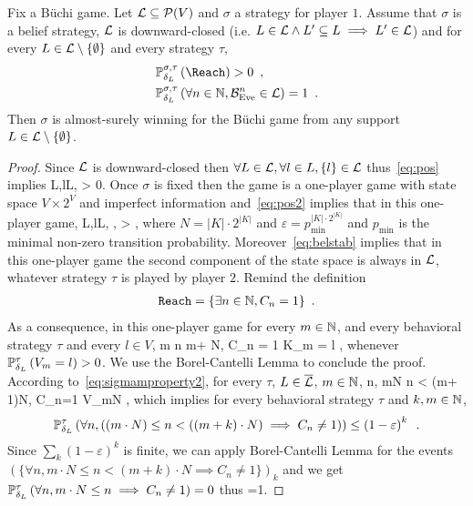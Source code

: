 \begin{lemma}\label{lem:borelcantelli}
{Fix a B{\"u}chi game.}
Let $\mathcal{L} \subseteq \mathcal{P}(V)$ 
and $\sigma$ a strategy for player $1$.
Assume that
$\sigma$ is a belief
strategy,
$\mathcal{L}$ is downward-closed
(i.e. $L\in\mathcal{L} \land L' \subseteq L \implies L'\in \mathcal{L}$)
and for every $L\in\mathcal{L}\setminus \{\emptyset\}$ and every strategy $\tau$,
\begin{align}
\label{eq:pos}
& \probimp{\sigma,\tau}{\delta_L}{\Reach} > 0\enspace,\\
 \label{eq:belstab}
&\probimp{\sigma,\tau}{\delta_L}{\forall n\in\NN,\belun^n\in \LL} = 1\enspace.
\end{align}
Then $\sigma$ is almost-surely winning for the B{\"u}chi game from any support 
$L\in \mathcal{L}\setminus \{\emptyset\}$. 
\end{lemma}
\begin{proof}
{
Since $\mathcal{L}$ is downward-closed then $\forall L\in \mathcal{L},\forall l\in L, \{l\}\in\mathcal{L}$
thus~\eqref{eq:pos} implies 
\be
\forall L\in \LL,\forall l\in L,
  > 0\enspace.
 \label{eq:pos2}
\ee 
}
{
Once $\sigma$ is fixed then the game is a one-player game with state space $V\times 2^V$ and imperfect information and~\eqref{eq:pos2} implies that in this one-player game,
\be
\label{eq:sigmamproperty}
\forall L\in \LL,\forall l\in L, \forall \tau,
  > \varepsilon\enspace,
 \ee
where $N=|K|\cdot 2^{|K|}$
and $\varepsilon = p_{\min}^{|K|\cdot 2^{|K|}}$
and $p_{\min}$ is the minimal non-zero transition probability.
Moreover~\eqref{eq:belstab} implies that
in this one-player game the second component of the state space is always in $\mathcal{L}$, whatever strategy $\tau$ is played by player $2$.
Remind the definition
 \begin{align*}
 {\tt Reach}=\{\exists n\in\mathbb{N}, C_n  = 1\}\enspace.
\end{align*}
As a consequence, in this one-player game
for every $m\in\mathbb{N}$,
and every behavioral strategy $\tau$ and every %
$l\in V$,
\be
\label{eq:sigmamproperty2}
{ \exists m \leq n \leq m+ N, C_n = 1 \mid
K_m = l
}
\geq \varepsilon,
\ee
whenever $\mathbb{P}^{\tau}_{\delta_L}\left({V_m=l}\right) > 0$.
}
We use the Borel-Cantelli Lemma to conclude the proof.
According to~\eqref{eq:sigmamproperty2},
for every $\tau$, $L\in\overline{\mathcal{L}}$, 
$m\in \mathbb{N}$,
\be
{}
{ \exists n, mN \leq n < (m+ 1)N, C_n=1
\mid V_{mN}
}
\geq \varepsilon,
\ee
which implies for every behavioral strategy $\tau$ and $k,m\in\mathbb{N}$,
\[
\mathbb{P}^{\tau}_{\delta_L}\left({\forall n,  \left((m\cdot N) \leq n < ((m+k) \cdot N) \implies  C_n \neq 1 \right)}\right)\leq  \left(1 - \varepsilon\right)^k\enspace.
\]
Since $\sum_k \left(1 - \varepsilon\right)^k$ is finite,
we can apply Borel-Cantelli Lemma for the events 
$(\{\forall n, m\cdot N \leq n < (m+k) \cdot N \implies  C_n\neq 1\})_k$
and we get
$\nonumber
\mathbb{P}^{\tau}_{\delta_L}\left({\forall n, m\cdot N \leq n  \implies  C_n\neq 1}\right)=0
$
thus
\be\label{eq:assss}\nonumber
{}=1\enspace.
\ee


\end{proof}
